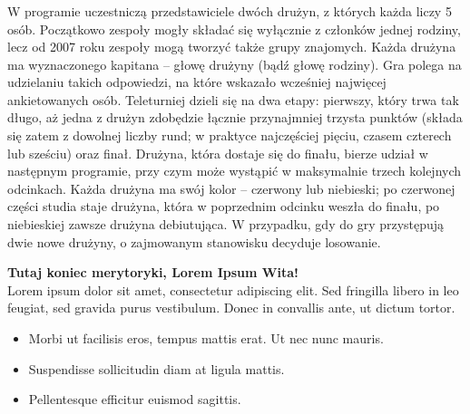\documentclass{beamer}
\begin{document}
\begin{frame}

\frametitle{}
\small{W programie uczestniczą przedstawiciele dwóch drużyn, z których każda liczy 5 osób. Początkowo zespoły mogły składać się 
wyłącznie z członków jednej rodziny, lecz od 2007 roku zespoły mogą tworzyć także grupy znajomych. Każda drużyna ma wyznaczonego 
kapitana – głowę drużyny (bądź głowę rodziny). Gra polega na udzielaniu takich odpowiedzi, na które wskazało wcześniej najwięcej 
ankietowanych osób. Teleturniej dzieli się na dwa etapy: pierwszy, który trwa tak długo, aż jedna z drużyn zdobędzie łącznie 
przynajmniej trzysta punktów (składa się zatem z dowolnej liczby rund; w praktyce najczęściej pięciu, czasem czterech lub sześciu) oraz 
finał. Drużyna, która dostaje się do finału, bierze udział w następnym programie, przy czym może wystąpić w maksymalnie trzech kolejnych 
odcinkach. Każda drużyna ma swój kolor – czerwony lub niebieski; po czerwonej części studia staje drużyna, która w poprzednim odcinku 
weszła do finału, po niebieskiej zawsze drużyna debiutująca. W przypadku, gdy do gry przystępują dwie nowe drużyny, o zajmowanym 
stanowisku decyduje losowanie.}

\end{frame}
\begin{frame}[label=tabela]


\end{frame}
\begin{frame}[label=StartLoremu]

\large{\textbf{Tutaj koniec merytoryki, Lorem Ipsum Wita!}}\\
Lorem ipsum dolor sit amet, consectetur adipiscing elit. Sed fringilla libero in leo feugiat, sed gravida purus vestibulum. Donec in 
convallis ante, ut dictum tortor.
\begin{itemize}
    \item Morbi ut facilisis eros, tempus mattis erat. Ut nec nunc mauris.
    \item Suspendisse sollicitudin diam at ligula mattis.
    \item Pellentesque efficitur euismod sagittis.
\end{itemize}
\end{frame}
\end{document}

